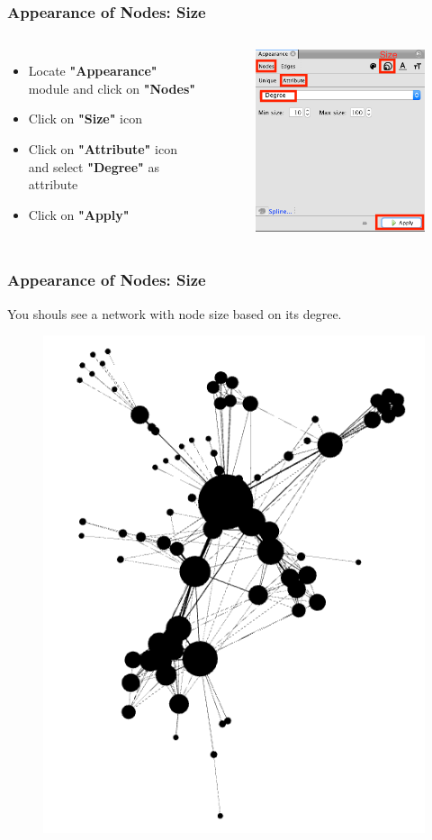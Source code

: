 \documentclass[10pt]{beamer}
\begin{document}
\begin{frame}
\frametitle{Appearance of Nodes: Size}

\begin{columns}[c] 
\begin{itemize}
\item Locate \textbf{"Appearance"} module and click on \textbf{"Nodes"}
\item Click on \textbf{"Size"} icon
\item Click on \textbf{"Attribute"} icon and select \textbf{"Degree"} as attribute
\item Click on \textbf{"Apply"}
\end{itemize}
\begin{figure}
\includegraphics[width=0.8\linewidth]{figures/node_size.png}
\end{figure}
\end{columns}
\end{frame}

\begin{frame}
\frametitle{Appearance of Nodes: Size}
You shouls see a network with node size based on its degree.
\begin{figure}
\includegraphics[width=0.4\linewidth]{figures/network_with_node_size.png}
\end{figure}
\end{frame}
\end{document}
